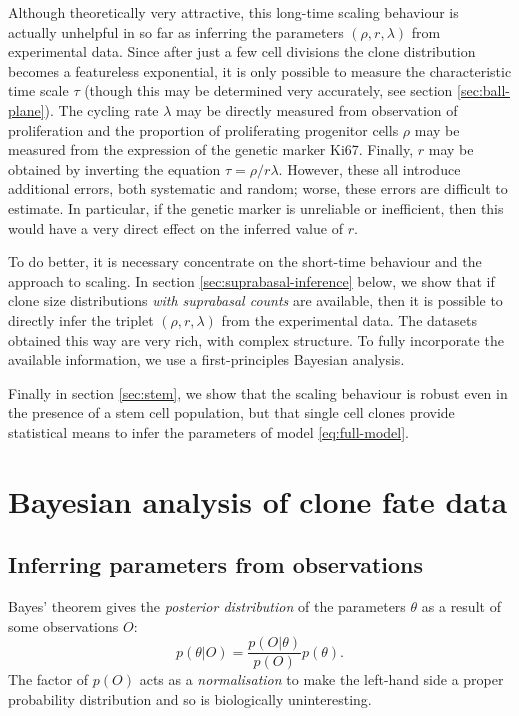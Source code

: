 \documentclass[10pt,UKenglish]{article}
\begin{document}
Although theoretically very attractive, this long-time scaling behaviour is actually unhelpful in so far as inferring the parameters $(\rho, r, \lambda)$ from experimental data. Since after just a few cell divisions the clone distribution becomes a featureless exponential, it is only possible to measure the characteristic time scale $\tau$ (though this may be determined very accurately, see section \ref{sec:ball-plane}). The cycling rate $\lambda$ may be directly measured from observation of proliferation and the proportion of proliferating progenitor cells $\rho$ may be measured from the expression of the genetic marker Ki67. Finally, $r$ may be obtained by inverting the equation $\tau = \rho/r\lambda$. However, these all introduce additional errors, both systematic and random; worse, these errors are difficult to estimate. In particular, if the genetic marker is unreliable or inefficient, then this would have a very direct effect on the inferred value of $r$.

To do better, it is necessary concentrate on the short-time behaviour and the approach to scaling. In section \ref{sec:suprabasal-inference} below, we show that if clone size distributions \emph{with suprabasal counts} are available, then it is possible to directly infer the triplet $(\rho, r, \lambda)$ from the experimental data. The datasets obtained this way are very rich, with complex structure. To fully incorporate the available information, we use a first-principles Bayesian analysis.

Finally in section \ref{sec:stem}, we show that the scaling behaviour is robust even in the presence of a stem cell population, but that single cell clones provide statistical means to infer the parameters of model \ref{eq:full-model}.

\section{\label{sec:suprabasal-inference}Bayesian analysis of clone fate data}

\subsection{Inferring parameters from observations}

Bayes' theorem gives the \emph{posterior distribution} of the parameters $\theta$ as a result of some observations $O$: $$p(\theta|O) = \frac{p(O|\theta)}{p(O)} p(\theta).$$ The factor of $p(O)$ acts as a \emph{normalisation} to make the left-hand side a proper probability distribution and so is biologically uninteresting. 
\end{document}
